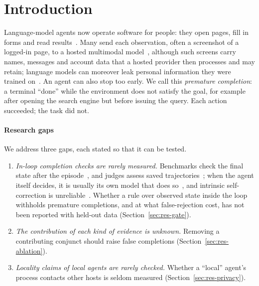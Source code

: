 \section{Introduction}
\label{sec:intro}

Language-model agents now operate software for people: they open pages, fill in forms and read results~\cite{zhou2024webarena,he2024webvoyager,xie2024osworld}. Many send each observation, often a screenshot of a logged-in page, to a hosted multimodal model~\cite{he2024webvoyager,zheng2024seeact,zhang2025ufo}, although such screens carry names, messages and account data that a hosted provider then processes and may retain; language models can moreover leak personal information they were trained on~\cite{lukas2023pii}. An agent can also stop too early. We call this \emph{premature completion}: a terminal ``done'' while the environment does not satisfy the goal, for example after opening the search engine but before issuing the query. Each action succeeded; the task did not.

\paragraph{Research gaps} We address three gaps, each stated so that it can be tested.
\begin{enumerate}
\item[G1] \emph{In-loop completion checks are rarely measured.} Benchmarks check the final state after the episode~\cite{zhou2024webarena,xie2024osworld}, and judges assess saved trajectories~\cite{he2024webvoyager,pan2024autonomous}; when the agent itself decides, it is usually its own model that does so~\cite{yao2023react,zhang2025ufo}, and intrinsic self-correction is unreliable~\cite{huang2024cannot}. Whether a rule over observed state inside the loop withholds premature completions, and at what false-rejection cost, has not been reported with held-out data (Section~\ref{sec:res-gate}).
\item[G2] \emph{The contribution of each kind of evidence is unknown.} Removing a contributing conjunct should raise false completions (Section~\ref{sec:res-ablation}).
\item[G3] \emph{Locality claims of local agents are rarely checked.} Whether a ``local'' agent's process contacts other hosts is seldom measured (Section~\ref{sec:res-privacy}).
\end{enumerate}

